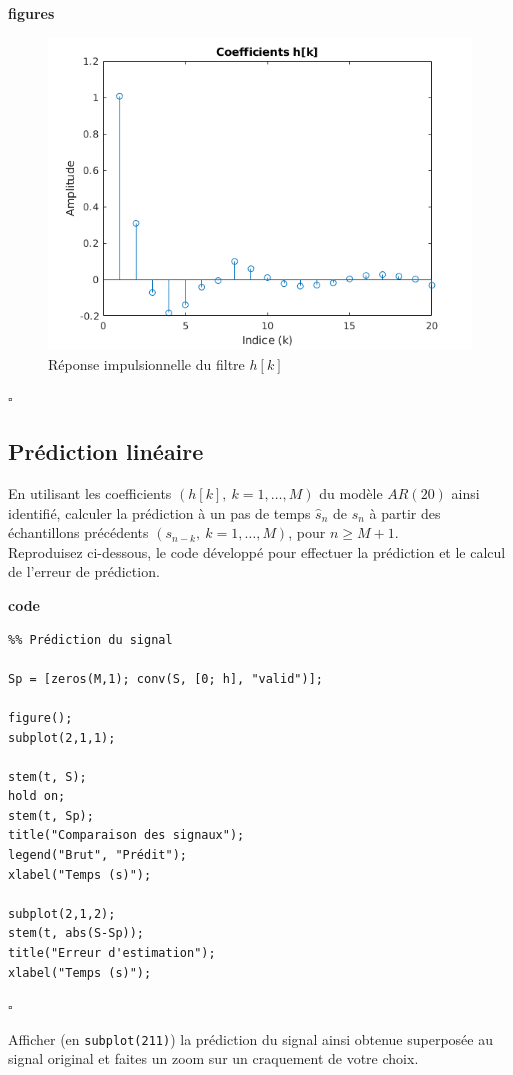 \documentclass{article}
\newcommand{\debutrep}[1]{\color{blue}\begin{center} \hrulefill \textbf{ #1 } \hrulefill \end{center} }
\newcommand{\finrep}{\vspace*{5mm}\hfill $\square$\color{black}\vspace*{5mm}}
\begin{document}
\debutrep{figures}
\begin{figure}[H]
    \includegraphics[width=\columnwidth]{coefs-h.png}
    \caption{Réponse impulsionnelle du filtre $h[k]$}
\end{figure}
\finrep

\subsection{Prédiction linéaire}
\label{sec:predlin}

En utilisant les coefficients $(h[k],~k=1,\ldots,M)$ du modèle $AR(20)$ ainsi identifié, calculer la prédiction à un pas de temps $\hat{s}_n$ de $s_n$ à partir des échantillons précédents $(s_{n-k},~k=1,\ldots,M)$, pour $n \geq M+1$.\\[1mm]
Reproduisez ci-dessous, le code développé pour effectuer la prédiction et le calcul de l'erreur de prédiction.

\debutrep{code}
\begin{verbatim}
%% Prédiction du signal

Sp = [zeros(M,1); conv(S, [0; h], "valid")];

figure();
subplot(2,1,1);

stem(t, S);
hold on;
stem(t, Sp);
title("Comparaison des signaux");
legend("Brut", "Prédit");
xlabel("Temps (s)");

subplot(2,1,2);
stem(t, abs(S-Sp));
title("Erreur d'estimation");
xlabel("Temps (s)");
\end{verbatim}
\finrep

Afficher (en {\tt subplot(211)}) la prédiction du signal ainsi obtenue superposée au  signal original et faites un zoom sur un craquement de votre choix.
\end{document}
